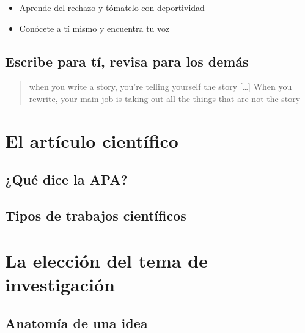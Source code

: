 \documentclass[
]{book}
\providecommand{\tightlist}{%
  \setlength{\itemsep}{0pt}\setlength{\parskip}{0pt}}
\begin{document}
\begin{itemize}
\tightlist
\item
  Aprende del rechazo y tómatelo con deportividad
\item
  Conócete a tí mismo y encuentra tu voz
\end{itemize}

\hypertarget{escribe-para-tuxed-revisa-para-los-demuxe1s}{%
\section{Escribe para tí, revisa para los demás}\label{escribe-para-tuxed-revisa-para-los-demuxe1s}}

\begin{quote}
when you write a story, you're telling yourself the story {[}\ldots{]} When you rewrite, your main job is taking out all the things that are not the story
\end{quote}

\hypertarget{el-artuxedculo-cientuxedfico}{%
\chapter{El artículo científico}\label{el-artuxedculo-cientuxedfico}}

\hypertarget{quuxe9-dice-la-apa}{%
\section{¿Qué dice la APA?}\label{quuxe9-dice-la-apa}}

\hypertarget{tipos-de-trabajos-cientuxedficos}{%
\section{Tipos de trabajos científicos}\label{tipos-de-trabajos-cientuxedficos}}

\hypertarget{la-elecciuxf3n-del-tema-de-investigaciuxf3n}{%
\chapter{La elección del tema de investigación}\label{la-elecciuxf3n-del-tema-de-investigaciuxf3n}}

\hypertarget{anatomuxeda-de-una-idea}{%
\section{Anatomía de una idea}\label{anatomuxeda-de-una-idea}}
\end{document}
